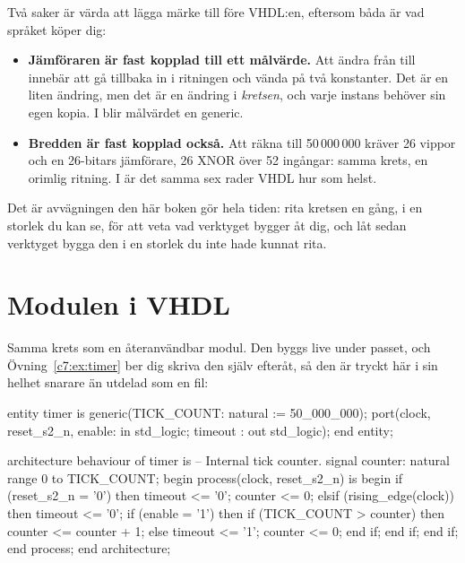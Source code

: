 Två saker är värda att lägga märke till före VHDL:en, eftersom båda är vad språket köper dig:
\begin{itemize}
  \item \textbf{Jämföraren är fast kopplad till ett målvärde.} Att ändra  från
     till  innebär att gå tillbaka in i ritningen och vända på två konstanter. Det
    är en liten ändring, men det är en ändring i \emph{kretsen}, och varje instans behöver sin egen
    kopia. I  blir målvärdet en generic.
  \item \textbf{Bredden är fast kopplad också.} Att räkna till 50\,000\,000 kräver 26 vippor och en
    26-bitars jämförare, 26 XNOR över 52 ingångar: samma krets, en orimlig ritning. I
     är det samma sex rader VHDL hur som helst.
\end{itemize}

Det är avvägningen den här boken gör hela tiden: rita kretsen en gång, i en storlek du kan se, för
att veta vad verktyget bygger åt dig, och låt sedan verktyget bygga den i en storlek du inte hade
kunnat rita.

\section{Modulen  i VHDL}
\label{c7:sec:module}

Samma krets som en återanvändbar modul. Den byggs live under passet, och
Övning~\ref{c7:ex:timer} ber dig skriva den själv efteråt, så den är tryckt här i sin helhet
snarare än utdelad som en fil:

\begin{vhdlcode}
entity timer is
    generic(TICK_COUNT: natural := 50_000_000);
    port(clock, reset_s2_n, enable: in std_logic;
         timeout                  : out std_logic);
end entity;

architecture behaviour of timer is
-- Internal tick counter.
signal counter: natural range 0 to TICK_COUNT;
begin
    process(clock, reset_s2_n) is
    begin
        if (reset_s2_n = '0') then
            timeout <= '0';
            counter <= 0;
        elsif (rising_edge(clock)) then
            timeout <= '0';
            if (enable = '1') then
                if (TICK_COUNT > counter) then
                    counter <= counter + 1;
                else
                    timeout <= '1';
                    counter <= 0;
                end if;
            end if;
        end if;
    end process;
end architecture;
\end{vhdlcode}

